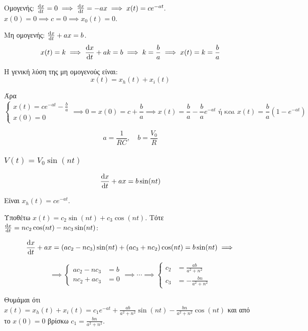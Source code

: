 \documentclass[11pt,a4paper,titlepage,draft]{article}
\begin{document}
Ομογενής: \(\frac{\dif x}{\dif t}=0 \implies \frac{\dif x}{\dif t} = -ax \implies x(t)=ce^{-at}.\)\\\(x(0)=0\implies c=0 \implies x_0(t)=0\).

Μη ομογενής: \(\frac{\dif x}{\dif t}+ax=b\).
\[
x(t)=k \implies \frac{\dif x}{\dif t}+ak=b \implies k =\frac{b}{a} \implies x(t)=k=\frac{b}{a}
\]

\begin{theorem*}{}
Η γενική λύση της μη ομογενούς είναι:
\[x(t) = x_h(t)+x_i(t) \]
\end{theorem*}

Άρα \[
\begin{cases}
x(t) = ce^{-at} - \frac{b}{a} \\
x(0) = 0
\end{cases}
\implies 0=x(0)=c+\frac{b}{a}
\implies x(t) =\frac{b}{a}-\frac{b}{a}e^{-at} \text{ ή και }
 x(t) =\frac{b}{a}(1-e^{-at})
 \]

 
\[
a=\frac{1}{RC}, \quad b= \frac{V_0}{R}
\]

\subsubsection{\(V(t)=V_0 \sin(nt)\)}
\[
\frac{\dif x}{\dif t} + ax = b\sin (nt)
\]

Είναι \(x_h(t) = ce^{-at}\).

Υποθέτω \(x(t) = c_2 \sin (nt) + c_3 \cos (nt) \). Τότε \( \frac{\dif x}{\dif t} = nc_2 \cos (nt) - nc_3 \sin (nt) \):

\[ \frac{\dif x}{\dif t} +ax =
\left( ac_2 - nc_3
\right)
\sin (nt) +
\left( ac_3 + nc_2
\right) \cos (nt)
= b \sin (nt) \implies
\]

\[
\implies
\begin{cases}
ac_2-nc_3&=b \\
nc_2+ac_3&=0 
\end{cases}
\implies \cdots \implies
\begin{cases}
c_2 &= \frac{ab}{a^2+n^2} \\
c_3 &= -\frac{bn}{a^2+n^2} 
\end{cases}
\]

Θυμάμαι ότι \(x(t) = x_h(t)+x_i(t) = c_1e^{-at} + \frac{ab}{a^2+n^2} \sin (nt) -  \frac{bn}{a^2+n^2} \cos (nt)\) και από το \(x(0)=0\) βρίσκω \(c_1 = \frac{bn}{a^2+n^2}\).
\end{document}
